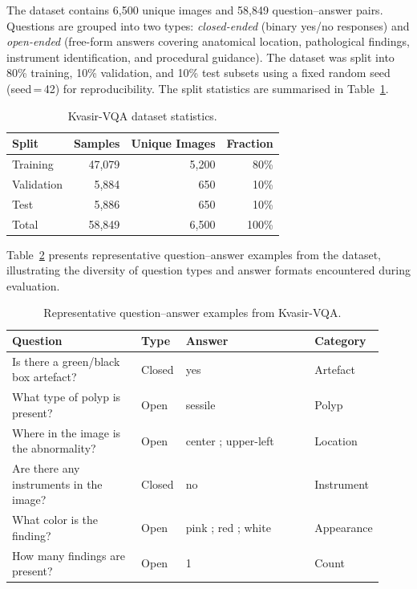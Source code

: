\documentclass[9pt]{report}
\begin{document}
The dataset contains 6,500 unique images and 58,849 question--answer pairs. Questions are grouped into two types: \textit{closed-ended} (binary yes/no responses) and \textit{open-ended} (free-form answers covering anatomical location, pathological findings, instrument identification, and procedural guidance). The dataset was split into 80\% training, 10\% validation, and 10\% test subsets using a fixed random seed (seed\,=\,42) for reproducibility. The split statistics are summarised in Table~\ref{tab:dataset}.

\begin{table}[h]
\centering
\caption{Kvasir-VQA dataset statistics.}
\label{tab:dataset}
\begin{tabular}{lrrr}
\hline
\textbf{Split} & \textbf{Samples} & \textbf{Unique Images} & \textbf{Fraction} \\ \hline
Training   & 47,079 & 5,200 & 80\% \\
Validation &  5,884 &   650 & 10\% \\
Test       &  5,886 &   650 & 10\% \\ \hline
Total      & 58,849 & 6,500 & 100\% \\ \hline
\end{tabular}
\end{table}

Table~\ref{tab:dataset_examples} presents representative question--answer examples from the dataset, illustrating the diversity of question types and answer formats encountered during evaluation.

\begin{table}[h]
\centering
\caption{Representative question--answer examples from Kvasir-VQA.}
\label{tab:dataset_examples}
\begin{tabular}{p{0.35\linewidth}p{0.12\linewidth}p{0.35\linewidth}p{0.1\linewidth}}
\hline
\textbf{Question} & \textbf{Type} & \textbf{Answer} & \textbf{Category} \\ \hline
Is there a green/black box artefact?       & Closed & yes                    & Artefact \\
What type of polyp is present?             & Open   & sessile                & Polyp \\
Where in the image is the abnormality?     & Open   & center ; upper-left    & Location \\
Are there any instruments in the image?    & Closed & no                     & Instrument \\
What color is the finding?                 & Open   & pink ; red ; white     & Appearance \\
How many findings are present?             & Open   & 1                      & Count \\ \hline
\end{tabular}
\end{table}
\end{document}
